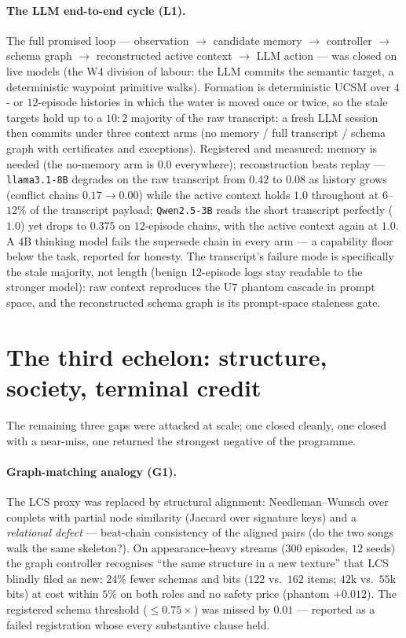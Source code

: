 \documentclass{article}
\begin{document}
\paragraph{The LLM end-to-end cycle (L1).} The full promised loop ---
observation $\to$ candidate memory $\to$ controller $\to$ schema
graph $\to$ reconstructed active context $\to$ LLM action --- was
closed on live models (the W4 division of labour: the LLM commits the
semantic target, a deterministic waypoint primitive walks). Formation
is deterministic UCSM over $4$- or $12$-episode histories in which
the water is moved once or twice, so the stale targets hold up to a
$10{:}2$ majority of the raw transcript; a fresh LLM session then
commits under three context arms (no memory / full transcript /
schema graph with certificates and exceptions). Registered and
measured: memory is needed (the no-memory arm is $0.0$ everywhere);
reconstruction beats replay --- \texttt{llama3.1-8B} degrades on the
raw transcript from $0.42$ to $0.08$ as history grows (conflict
chains $0.17 \to 0.00$) while the active context holds $1.0$
throughout at $6$--$12\%$ of the transcript payload;
\texttt{Qwen2.5-3B} reads the short transcript perfectly ($1.0$) yet
drops to $0.375$ on $12$-episode chains, with the active context
again at $1.0$. A $4$B thinking model fails the supersede chain in
every arm --- a capability floor below the task, reported for
honesty. The transcript's failure mode is specifically the stale
majority, not length (benign $12$-episode logs stay readable to the
stronger model): raw context reproduces the U7 phantom cascade in
prompt space, and the reconstructed schema graph is its prompt-space
staleness gate.


\section{The third echelon: structure, society, terminal credit}
\label{p5:sec:echelon3}

The remaining three gaps were attacked at scale; one closed cleanly,
one closed with a near-miss, one returned the strongest negative of
the programme.

\paragraph{Graph-matching analogy (G1).} The LCS proxy was replaced
by structural alignment: Needleman--Wunsch over couplets with partial
node similarity (Jaccard over signature keys) and a \emph{relational
defect} --- beat-chain consistency of the aligned pairs (do the two
songs walk the same skeleton?). On appearance-heavy streams
($300$ episodes, $12$ seeds) the graph controller recognises ``the
same structure in a new texture'' that LCS blindly filed as new:
$24\%$ fewer schemas and bits ($122$ vs.\ $162$ items; $42$k vs.\
$55$k bits) at cost within $5\%$ on both roles and no safety price
(phantom $+0.012$). The registered schema threshold ($\le 0.75\times$)
was missed by $0.01$ --- reported as a failed registration whose
every substantive clause held.
\end{document}
